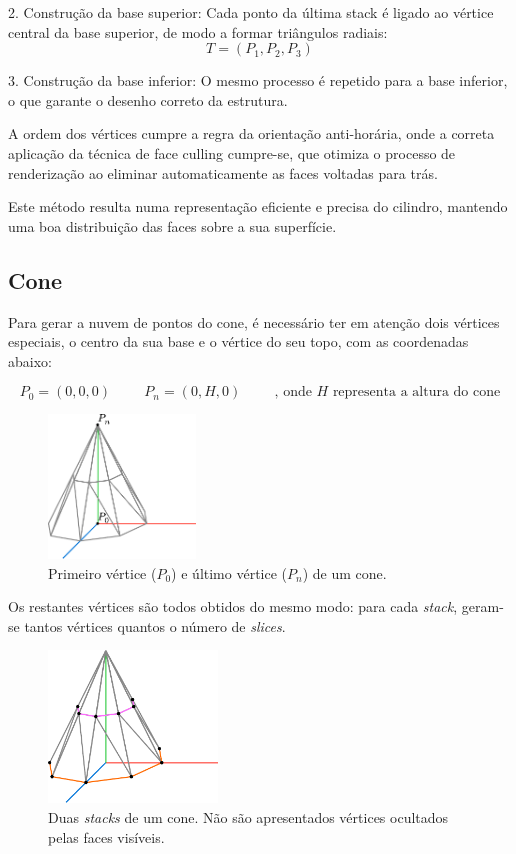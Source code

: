 \documentclass[12pt, a4paper]{article}
\begin{document}
2. Construção da base superior:
Cada ponto da última stack é ligado ao vértice central da base superior, de modo a formar
triângulos radiais:
\[
T = (P_1, P_2, P_3)
\]

3. Construção da base inferior:
O mesmo processo é repetido para a base inferior, o que garante o desenho correto da estrutura.

A ordem dos vértices cumpre a regra da orientação anti-horária, onde a correta
aplicação da técnica de face culling cumpre-se, que otimiza o processo de renderização
ao eliminar automaticamente as faces voltadas para trás.

Este método resulta numa representação eficiente e precisa do cilindro, mantendo uma boa
distribuição das faces sobre a sua superfície.

\subsection{Cone}

Para gerar a nuvem de pontos do cone, é necessário ter em atenção dois vértices especiais, o centro
da sua base e o vértice do seu topo, com as coordenadas abaixo:

$$
P_0 = (0, 0, 0)
\hspace{1cm}
P_n = (0, H, 0)
\hspace{1cm}
\text{, onde $H$ representa a altura do cone}
$$

\begin{figure}[H]
    \centering
    \includegraphics[width=0.35\textwidth]{res/figures/Cone1.pdf}
    \caption{Primeiro vértice ($P_0$) e último vértice ($P_n$) de um cone.}
\end{figure}

Os restantes vértices são todos obtidos do mesmo modo: para cada \emph{stack}, geram-se tantos
vértices quantos o número de \emph{slices}.

\begin{figure}[H]
    \centering
    \includegraphics[width=0.4\textwidth]{res/figures/Cone2.pdf}
    \caption{
        Duas \emph{stacks} de um cone. Não são apresentados vértices ocultados pelas faces visíveis.
    }
\end{figure}
\end{document}
